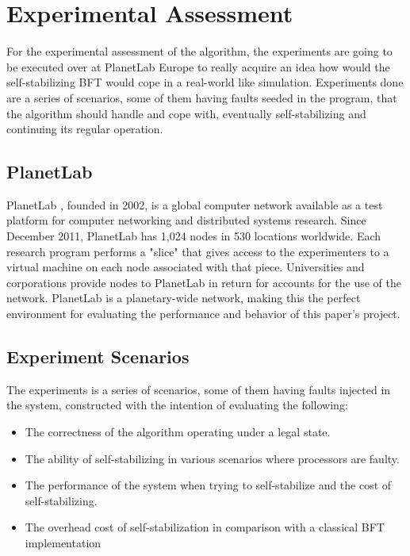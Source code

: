 \documentclass[12pt,a4paper]{report}
\begin{document}
    		    
		   
	\newpage
	\chapter{Experimental Assessment}
	    For the experimental assessment of the algorithm, the experiments are going to be executed over at PlanetLab Europe\cite{planetLab} to really acquire an idea how would the self-stabilizing BFT would cope in a real-world like simulation. Experiments done are a series of scenarios, some of them having faults seeded in the program, that the algorithm should handle and cope with, eventually self-stabilizing and continuing its regular operation.
		\section{PlanetLab}
		PlanetLab \cite{planetLab}, founded in 2002, is a global computer network available as a test platform for computer networking and distributed systems research. Since December 2011, PlanetLab has 1,024 nodes in 530 locations worldwide. Each research program performs a "slice" that gives access to the experimenters to a virtual machine on each node associated with that piece.
		Universities and corporations provide nodes to PlanetLab in return for accounts for the use of the network. PlanetLab is a planetary-wide network, making this the perfect environment for evaluating the performance and behavior of this paper's project.
		
		\section{Experiment Scenarios}
    		The experiments is a series of scenarios, some of them having faults injected in the system, constructed with the intention of evaluating the following: 
    		\begin{itemize}
                \item The correctness of the algorithm operating under a legal state.
    			\item The ability of self-stabilizing in various scenarios where processors are faulty.
    			\item The performance of the system when trying to self-stabilize and the cost of self-stabilizing.
    			\item The overhead cost of self-stabilization in comparison with a classical BFT implementation
    		\end{itemize}
    		
\end{document}
